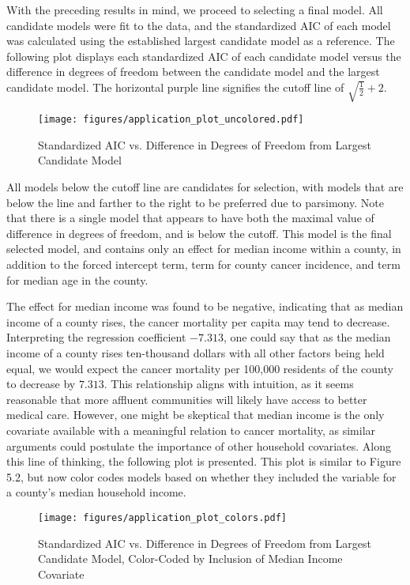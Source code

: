 		With the preceding results in mind, we proceed to selecting a final model. All candidate models were fit to the data, and the standardized AIC of each model was calculated
		using the established largest candidate model as a reference. The following plot displays each standardized AIC of each candidate model versus the difference in
		degrees of freedom between the candidate model and the largest candidate model. The horizontal purple line signifies the cutoff line of $\sqrt{\frac{1}{2}} + 2$.

		\begin{figure}[H]
			\centering
			\captionsetup{justification=centering}
			\texttt{[image: figures/application\_plot\_uncolored.pdf]}
			\caption{\label{fig:app_stand_AIC_plot_no_colors} Standardized AIC vs. Difference in Degrees of Freedom from Largest Candidate Model}
		\end{figure}

		All models below the cutoff line are candidates for selection, with models that are below the line and farther to the right to be preferred due to parsimony. Note
		that there is a single model that appears to have both the maximal value of difference in degrees of freedom, and is below the cutoff. This model is the
		final selected model, and contains only an effect for median income within a county, in addition to the forced intercept term, term for county cancer incidence,
		and term for median age in the county.
		
		The effect for median income was found to be negative, indicating that as median income of a county rises, the cancer mortality per capita may tend to
		decrease.  Interpreting the regression coefficient $-7.313$, one could say that as the median income of a county rises ten-thousand dollars with all other factors being
		held equal, we would expect the cancer mortality per 100,000 residents of the county to decrease by $7.313$. This relationship aligns with intuition, as it seems reasonable
		that more affluent communities will likely have access to better medical care. However, one might be skeptical that median income is the only covariate available with a meaningful
		relation to cancer mortality, as similar arguments could postulate the importance of other household covariates. Along this line of thinking, the following plot
		is presented. This plot is similar to Figure 5.2, but now color codes models based on whether they included the variable for a county's median household income.

		\begin{figure}[H]
			\centering
			\captionsetup{justification=centering}
			\texttt{[image: figures/application\_plot\_colors.pdf]}
			\caption{\label{fig:app_stand_AIC_plot_colors} Standardized AIC vs. Difference in Degrees of Freedom from Largest Candidate Model,
			Color-Coded by Inclusion of Median Income Covariate}
		\end{figure}

